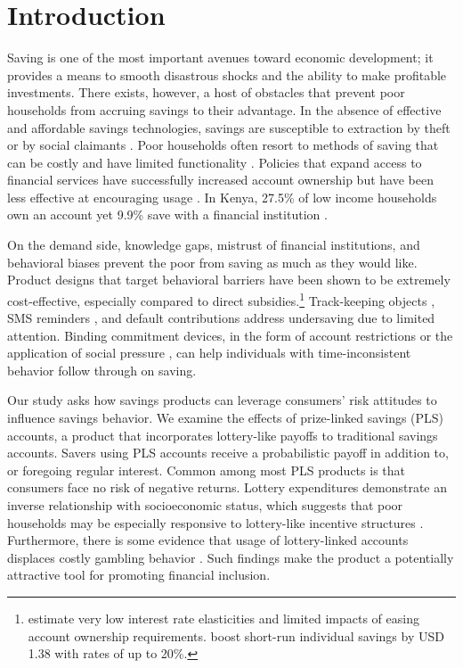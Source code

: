 \documentclass[12pt]{article}
\begin{document}
\newpage

\section{Introduction}

	Saving is one of the most important avenues toward economic development; it provides a means to smooth disastrous shocks and the ability to make profitable investments. There exists, however, a host of obstacles that prevent poor households from accruing savings to their advantage. In the absence of effective and affordable savings technologies, savings are susceptible to extraction by theft or by social claimants . Poor households often resort to methods of saving that can be costly and have limited functionality . Policies that expand access to financial services have successfully increased account ownership but have been less effective at encouraging usage . In Kenya, 27.5\% of low income households own an account yet 9.9\% save with a financial institution .

	On the demand side, knowledge gaps, mistrust of financial institutions, and behavioral biases prevent the poor from saving as much as they would like. Product designs that target behavioral barriers have been shown to be extremely cost-effective, especially compared to direct  subsidies.\footnote{ estimate very low interest rate elasticities and limited impacts of easing account ownership requirements.  boost short-run individual savings by USD 1.38 with rates of up to 20\%.} Track-keeping objects , SMS reminders , and default contributions  address undersaving due to limited attention. Binding commitment devices, in the form of account restrictions  or the application of social pressure , can help individuals with time-inconsistent behavior follow through on saving.

	Our study asks how savings products can leverage consumers' risk attitudes to influence savings behavior. We examine the effects of prize-linked savings (PLS) accounts, a product that incorporates lottery-like payoffs to traditional savings accounts. Savers using PLS accounts receive a probabilistic payoff in addition to, or foregoing regular interest. Common among most PLS products is that consumers face no risk of negative returns. Lottery expenditures demonstrate an inverse relationship with socioeconomic status, which suggests that poor households may be especially responsive to lottery-like incentive structures . Furthermore, there is some evidence that usage of lottery-linked accounts displaces costly gambling behavior . Such findings make the product a potentially attractive tool for promoting financial inclusion.
\end{document}
